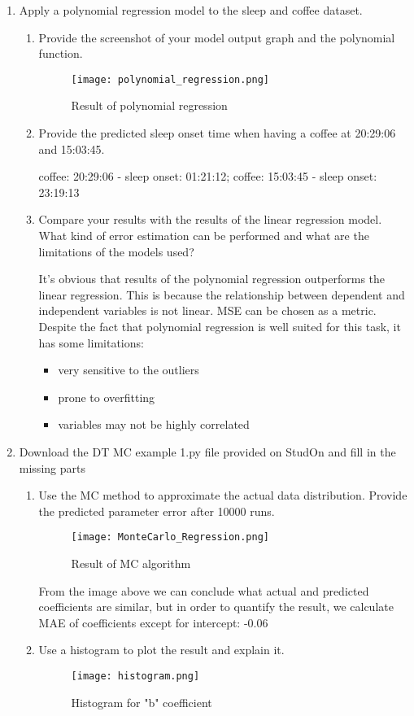 \documentclass{homework}
\begin{document}
\exercise
\begin{enumerate}
	\item Apply a polynomial regression model to the sleep and coffee dataset.
	\begin{enumerate}[label=\alph*)]
		\item Provide the screenshot of your model output graph and the polynomial function.
		\begin{figure}[hbt!]
			\centering
			\texttt{[image: polynomial\_regression.png]}
			\caption{Result of polynomial regression}
		\end{figure}
	\item Provide the predicted sleep onset time when having a coffee at 20:29:06 and 15:03:45.

	coffee: 20:29:06 - sleep onset: 01:21:12; coffee: 15:03:45 - sleep onset: 23:19:13
	\item Compare your results with the results of the linear regression model. What kind of error estimation can be performed and what are the limitations of the models used?

	It's obvious that results of the polynomial regression outperforms the linear regression. This is because the relationship between dependent and independent variables is not linear. MSE can be chosen as a metric. Despite the fact that polynomial regression is well suited for this task, it has some limitations:
	\begin{itemize}
		\item very sensitive to the outliers
		\item prone to overfitting
		\item variables may not be highly correlated 
	\end{itemize}
	\end{enumerate}
	\item Download the DT MC example 1.py file provided on StudOn and fill in the missing parts
	\begin{enumerate}[label=\alph*)]
		\item Use the MC method to approximate the actual data distribution. Provide the predicted parameter error after 10000 runs.
		\newpage
		\begin{figure}[hbt!]
			\centering
			\texttt{[image: MonteCarlo\_Regression.png]}
			\caption{Result of MC algorithm}
		\end{figure}

		From the image above we can conclude what actual and predicted coefficients are similar, but in order to quantify the result, we calculate MAE of coefficients except for intercept: -0.06
		\item Use a histogram to plot the result and explain it.
		\begin{figure}[hbt!]
			\centering
			\texttt{[image: histogram.png]}
			\caption{Histogram for "b" coefficient}
		\end{figure}


\end{enumerate}
\end{enumerate}
\end{document}
